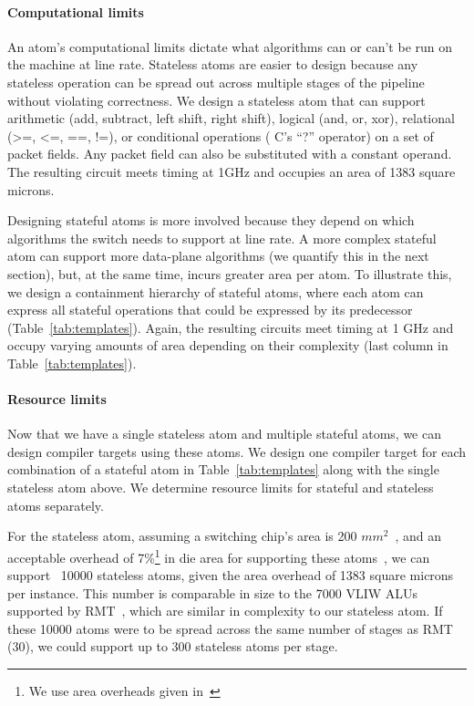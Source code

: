 \paragraph{Computational limits}
An atom's computational limits dictate what algorithms can or can't be run on
the \absmachine machine at line rate. Stateless atoms are easier to design
because any stateless operation can be spread out across multiple stages of the
pipeline without violating correctness. We design a stateless atom that can
support arithmetic (add, subtract, left shift, right shift), logical (and, or,
xor), relational (>=, <=, ==, !=), or conditional operations ( C's ``?''
operator) on a set of packet fields. Any packet field can also be substituted
with a constant operand. The resulting circuit meets timing at 1GHz and
occupies an area of 1383 square microns.

Designing stateful atoms is more involved because they depend on which
algorithms the switch needs to support at line rate. A more complex stateful
atom can support more data-plane algorithms (we quantify this in the next
section), but, at the same time, incurs greater area per atom. To illustrate
this, we design a containment hierarchy of stateful atoms, where each atom can
express all stateful operations that could be expressed by its predecessor
(Table~\ref{tab:templates}). Again, the resulting circuits meet timing at 1 GHz
and occupy varying amounts of area depending on their complexity (last column
in Table~\ref{tab:templates}).

\paragraph{Resource limits}
Now that we have a single stateless atom and multiple stateful atoms, we can
design compiler targets using these atoms.  We design one compiler target for
each combination of a stateful atom in Table~\ref{tab:templates} along with the
single stateless atom above. We determine resource limits for stateful and
stateless atoms separately.

For the stateless atom, assuming a switching chip's area is 200
$mm^2$~\cite{gibb_parsing}, and an acceptable overhead of 7\%\footnote{We use
area overheads given in~\cite{rmt}} in die area for supporting these
atoms~\cite{rmt}, we can support ~10000 stateless atoms, given the area
overhead of 1383 square microns per instance.  This number is comparable in
size to the 7000 VLIW ALUs supported by RMT~\cite{rmt}, which are similar in
complexity to our stateless atom. If these 10000 atoms were to be spread across
the same number of stages as RMT (30), we could support up to 300 stateless atoms
per stage.

